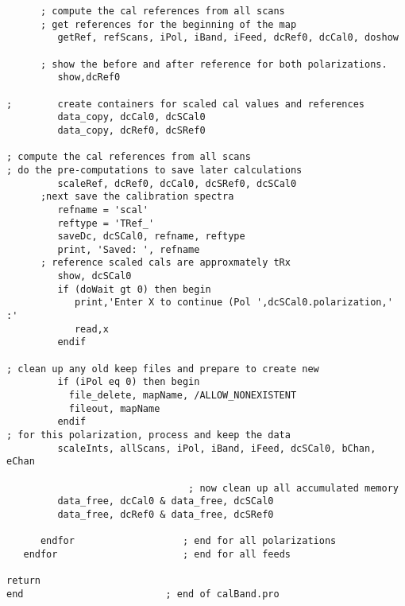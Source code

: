 \documentclass[12pt,twoside]{article}
\begin{document}
\begin{verbatim}
      ; compute the cal references from all scans
      ; get references for the beginning of the map
         getRef, refScans, iPol, iBand, iFeed, dcRef0, dcCal0, doshow

      ; show the before and after reference for both polarizations.
         show,dcRef0

;        create containers for scaled cal values and references
         data_copy, dcCal0, dcSCal0
         data_copy, dcRef0, dcSRef0

; compute the cal references from all scans
; do the pre-computations to save later calculations
         scaleRef, dcRef0, dcCal0, dcSRef0, dcSCal0
      ;next save the calibration spectra
         refname = 'scal'
         reftype = 'TRef_'
         saveDc, dcSCal0, refname, reftype
         print, 'Saved: ', refname
      ; reference scaled cals are approxmately tRx
         show, dcSCal0
         if (doWait gt 0) then begin 
            print,'Enter X to continue (Pol ',dcSCal0.polarization,' :'
            read,x
         endif

; clean up any old keep files and prepare to create new
         if (iPol eq 0) then begin
           file_delete, mapName, /ALLOW_NONEXISTENT
           fileout, mapName
         endif
; for this polarization, process and keep the data
         scaleInts, allScans, iPol, iBand, iFeed, dcSCal0, bChan, eChan 

                                ; now clean up all accumulated memory   
         data_free, dcCal0 & data_free, dcSCal0 
         data_free, dcRef0 & data_free, dcSRef0 

      endfor                   ; end for all polarizations
   endfor                      ; end for all feeds  

return
end                         ; end of calBand.pro
\end{verbatim}  
\end{document}

